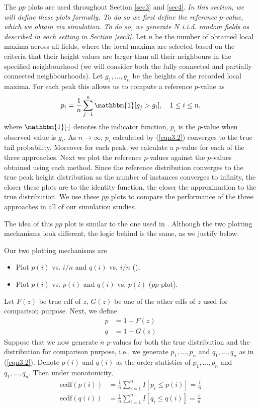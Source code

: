 \documentclass{article}
\newcommand{\nt}[1]{\textit{\color{red} #1}}
\begin{document}
The $pp$ plots are used throughout Section \ref{sec3} and \ref{sec4}. \nt{In this section, we will define these plots formally. To do so we first define the reference $p$-value, which we obtain via simulation. To do so, we generate $N$ i.i.d. random fields as described in each setting in Section \ref{sec3}.} Let $n$ be the number of obtained local maxima across all fields, where the local maxima are selected based on the criteria that their height values are larger than all their neighbours in the specified neighbourhood (we will consider both the fully connected and partially connected neighbourhoods).  Let $g_1, \dots, g_n$ be the heights of the recorded local maxima. For each peak this allows us to compute a reference $p$-value as
\begin{align}
    p_i = \frac{1}{n} \sum_{j = 1}^n \mathbbm{1} [ g_j > g_i],\quad 1 \leq i \leq n,  \label{eqn3.2}
\end{align}
where $\mathbbm{1}[\cdot]$ denotes the indicator function, $p_i$ is the $p$-value when observed value is $g_i$. As $n\rightarrow \infty$, $p_i$ calculated by (\ref{eqn3.2}) converges to the true tail probability. Moreover for each peak, we calculate a $p$-value for each of the three approaches. Next we plot the reference $p$-values against the $p$-values obtained using each method. Since the reference distribution converges to the true peak height distribution as the number of instances converges to infinity, the closer these plots are to the identity function, the closer the approximation to the true distribution. We use these $pp$ plots to compare the performance of the three approaches in all of our simulation studies. 

The idea of this $pp$ plot is similar to the one used in \cite{schwartzman2019peak}. Although the two plotting mechanisms look different, the logic behind is the same, as we justify below. 

Our two plotting mechanisms are
\begin{itemize}
    \item Plot $p(i)$ vs. $i/n$ and $q(i)$ vs. $i/n$ (\cite{schwartzman2019peak}),
    \item Plot $p(i)$ vs. $p(i)$ and $q(i)$ vs. $p(i)$ ($pp$ plot).
\end{itemize}

Let $F(z)$ be true cdf of $z$, $G(z)$ be one of the other cdfs of $z$ used for comparison purpose. Next, we define
\begin{align*}
    p &= 1-F(z)\\
    q &= 1-G(z)
\end{align*}
Suppose that we now generate $n$ $p$-values for both the true distribution and the distribution for comparison purpose, i.e., we generate $p_1,...,p_n$ and $q_1,...,q_n$ as in (\ref{eqn3.2}). Denote $p(i)$ and $q(i)$ as the order statistics of $p_1,...,p_n$ and $q_1,...,q_n$. Then under monotonicity, 
\begin{align*}
    \text{ecdf}(p(i)) &= \frac{1}{n}\sum_{i = 1}^n I[p_i \leq p(i)] = \frac{i}{n}\\
    \text{ecdf}(q(i)) &= \frac{1}{n}\sum_{i = 1}^n I[q_i \leq q(i)] = \frac{i}{n}
\end{align*}
\end{document}
